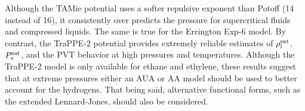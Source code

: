 \documentclass[journal=jctc,manuscript=article]{achemso}
\begin{document}
Although the TAMie potential uses a softer repulsive exponent than Potoff (14 instead of 16), it consistently over predicts the pressure for supercritical fluids and compressed liquids. The same is true for the Errington Exp-6 model. By contrast, the TraPPE-2 potential provides extremely reliable estimates of $\rho_{\rm l}^{\rm sat}$, $P_{\rm v}^{\rm sat}$, and the PVT behavior at high pressures and temperatures. Although the TraPPE-2 model is only available for ethane and ethylene, these results suggest that at extreme pressures either an AUA or AA model should be used to better account for the hydrogens. That being said, alternative functional forms, such as the extended Lennard-Jones, should also be considered.

\end{document}

